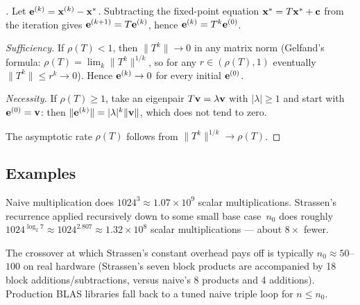 \begin{proof}[]
Let $\mathbf{e}^{(k)} = \mathbf{x}^{(k)} - \mathbf{x}^*$. Subtracting the
fixed-point equation $\mathbf{x}^* = T \mathbf{x}^* + \mathbf{c}$ from the
iteration gives $\mathbf{e}^{(k+1)} = T \mathbf{e}^{(k)}$, hence
$\mathbf{e}^{(k)} = T^k \mathbf{e}^{(0)}$.

\emph{Sufficiency.} If $\rho(T) < 1$, then $\|T^k\| \to 0$ in any
matrix norm (Gelfand's formula:
$\rho(T) = \lim_k \|T^k\|^{1/k}$, so for any
$r \in (\rho(T), 1)$ eventually $\|T^k\| \leq r^k \to 0$). Hence
$\mathbf{e}^{(k)} \to 0$ for every initial $\mathbf{e}^{(0)}$.

\emph{Necessity.} If $\rho(T) \geq 1$, take an eigenpair
$T \mathbf{v} = \lambda \mathbf{v}$ with $|\lambda| \geq 1$ and start
with $\mathbf{e}^{(0)} = \mathbf{v}$: then
$\|\mathbf{e}^{(k)}\| = |\lambda|^k \|\mathbf{v}\|$, which does not tend
to zero.

The asymptotic rate $\rho(T)$ follows from $\|T^k\|^{1/k} \to \rho(T)$.
\end{proof}

\subsection*{Examples}

\begin{example}[Naive vs. Strassen at $n = 1024$]
\label{ex:naive-vs-strassen}
Naive multiplication does $1024^3 \approx 1.07 \times 10^9$ scalar
multiplications. Strassen's recurrence applied recursively down to
some small base case~$n_0$ does roughly
$1024^{\log_2 7} \approx 1024^{2.807} \approx 1.32 \times 10^8$
scalar multiplications — about $8 \times$ fewer.

The crossover at which Strassen's constant overhead pays off is
typically $n_0 \approx 50$--$100$ on real hardware (Strassen's seven
block products are accompanied by 18 block additions/subtractions,
versus naive's 8 products and 4 additions). Production BLAS libraries
fall back to a tuned naive triple loop for $n \leq n_0$.
\end{example}

